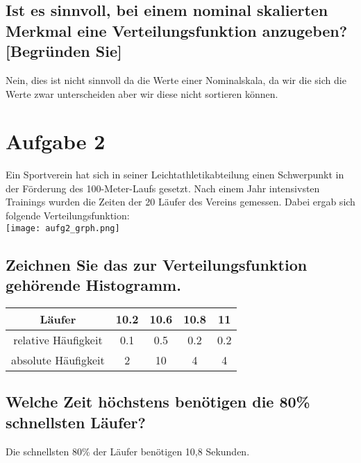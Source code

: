 \documentclass{article}
\begin{document}

\subsection{Ist es sinnvoll, bei einem nominal skalierten Merkmal eine Verteilungsfunktion
anzugeben? [Begründen Sie]}
Nein, dies ist nicht sinnvoll da die Werte einer Nominalskala, da wir die sich die Werte zwar unterscheiden aber wir diese nicht sortieren können.

\section{Aufgabe 2}
Ein Sportverein hat sich in seiner Leichtathletikabteilung einen Schwerpunkt in der Förderung des 100-Meter-Laufs gesetzt.
Nach einem Jahr intensivsten Trainings wurden die Zeiten der 20 Läufer des Vereins gemessen. Dabei ergab sich folgende Verteilungsfunktion:\\
\texttt{[image: aufg2\_grph.png]}

\subsection{Zeichnen Sie das zur Verteilungsfunktion gehörende Histogramm.}

\begin{center}
\begin{tabular}{ | c | c | c | c | c | } 
\hline
Läufer & 10.2 & 10.6 & 10.8 & 11\\
\hline
relative Häufigkeit & 0.1 & 0.5 & 0.2 & 0.2 \\
\hline
absolute Häufigkeit & 2 & 10 & 4 & 4\\
\hline
\end{tabular}
\end{center}


\subsection{Welche Zeit höchstens benötigen die 80\% schnellsten Läufer?}
Die schnellsten 80\% der Läufer benötigen 10,8 Sekunden.
\end{document}
